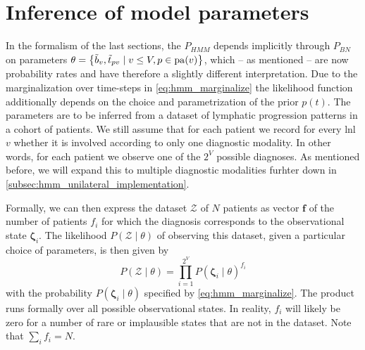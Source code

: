\documentclass[\relativeRoot/main.tex]{subfiles}
\begin{document}
\section{Inference of model parameters}
\label{sec:unilateral:inference}

In the formalism of the last sections, the $P_{HMM}$ depends implicitly through $P_{BN}$ on parameters $\theta = \left\{ \Tilde{b}_v , \Tilde{t}_{pv} \mid v \leq V , p \in \operatorname{pa}(v) \right\}$, which – as mentioned – are now probability rates and have therefore a slightly different interpretation. Due to the marginalization over time-steps in \cref{eq:hmm_marginalize} the likelihood function additionally depends on the choice and parametrization of the prior $p(t)$. The parameters are to be inferred from a dataset of lymphatic progression patterns in a cohort of patients. We still assume that for each patient we record for every \gls{lnl} $v$ whether it is involved according to only one diagnostic modality. In other words, for each patient we observe one of the $2^V$ possible diagnoses. As mentioned before, we will expand this to multiple diagnostic modalities furhter down in \cref{subsec:hmm_unilateral_implementation}.

Formally, we can then express the dataset $\boldsymbol{\mathcal{Z}}$ of $N$ patients as vector $\mathbf{f}$ of the number of patients $f_i$ for which the diagnosis corresponds to the observational state $\boldsymbol{\zeta}_i$. The likelihood $P \left( \boldsymbol{\mathcal{Z}} \mid \theta \right)$ of observing this dataset, given a particular choice of parameters, is then given by
%
\begin{equation}
    P \left( \boldsymbol{\mathcal{Z}} \mid \theta \right) = \prod_{i=1}^{2^V}{P \left( \boldsymbol{\zeta}_i \mid \theta \right)^{f_i}}
\end{equation}
%
with the probability $P \left( \boldsymbol{\zeta}_i \mid \theta \right)$ specified by \cref{eq:hmm_marginalize}. The product runs formally over all possible observational states. In reality, $f_i$ will likely be zero for a number of rare or implausible states that are not in the dataset. Note that $\sum_{i}{f_i} = N$.
\end{document}
